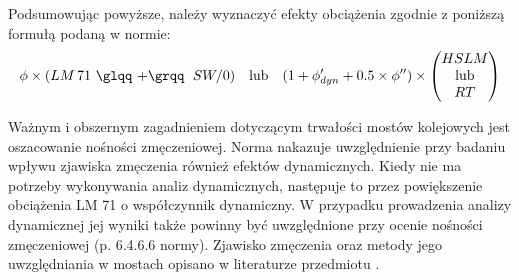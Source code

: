 Podsumowując powyższe, należy wyznaczyć efekty obciążenia zgodnie z poniższą formułą podaną w normie:
\begin{equation} \label{eq:SGN_dyna}
	\phi \times (LM\,71 \text{ \glqq +\grqq }\; SW/0)\quad \text{lub} \quad
	(1+\phi '_{dyn}+0.5 \times \phi'') \times 
	\begin{pmatrix}
		HSLM \\
		\text{lub} \\
		RT
	\end{pmatrix}
\end{equation}

Ważnym i obszernym zagadnieniem dotyczącym trwałości mostów kolejowych jest oszacowanie nośności zmęczeniowej. Norma nakazuje uwzględnienie przy badaniu wpływu zjawiska zmęczenia również efektów dynamicznych. Kiedy nie ma potrzeby wykonywania analiz dynamicznych, następuje to przez powiększenie obciążenia LM 71 o współczynnik dynamiczny. W przypadku prowadzenia analizy dynamicznej jej wyniki także powinny być uwzględnione przy ocenie nośności zmęczeniowej (p. 6.4.6.6 normy). Zjawisko zmęczenia oraz metody jego uwzględniania w mostach opisano w literaturze przedmiotu \parencite{Kocanda1985,Schijve2001,Malm2006,Siwowski2012,Siwowski2014,Szafranski2017}.


